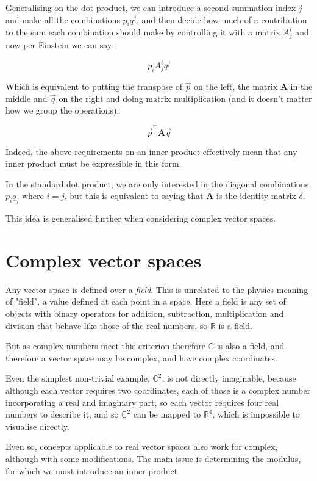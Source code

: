 Generalising on the dot product, we can introduce a second summation index $j$ and make all the combinations $p_iq^j$, and then decide how much of a contribution to the sum each combination should make by controlling it with a matrix $A^i_j$ and now per Einstein we can say:

$$p_i A^i_j q^j$$

Which is equivalent to putting the transpose of $\vec{p}$ on the left, the matrix $\mathbf{A}$ in the middle and $\vec{q}$ on the right and doing matrix multiplication (and it doesn't matter how we group the operations):

$$\vec{p}^\intercal\mathbf{A}\vec{q}$$

Indeed, the above requirements on an inner product effectively mean that any inner product must be expressible in this form.

In the standard dot product, we are only interested in the diagonal combinations, $p_i q_j$ where $i=j$, but this is equivalent to saying that $\mathbf{A}$ is the identity matrix $\delta$.

This idea is generalised further when considering complex vector spaces.

\section{Complex vector spaces}\label{sec:vectors-complex}

Any vector space is defined over a \textit{field}. This is unrelated to the physics meaning of "field", a value defined at each point in a space. Here a field is any set of objects with binary operators for addition, subtraction, multiplication and division that behave like those of the real numbers, so $\mathbb{R}$ is a field.

But as complex numbers meet this criterion therefore $\mathbb{C}$ is also a field, and therefore a vector space may be complex, and have complex coordinates.

Even the simplest non-trivial example, $\mathbb{C}^2$, is not directly imaginable, because although each vector requires two coordinates, each of those is a complex number incorporating a real and imaginary part, so each vector requires four real numbers to describe it, and so $\mathbb{C}^2$ can be mapped to $\mathbb{R}^4$, which is impossible to visualise directly.

Even so, concepts applicable to real vector spaces also work for complex, although with some modifications. The main issue is determining the modulus, for which we must introduce an inner product.

